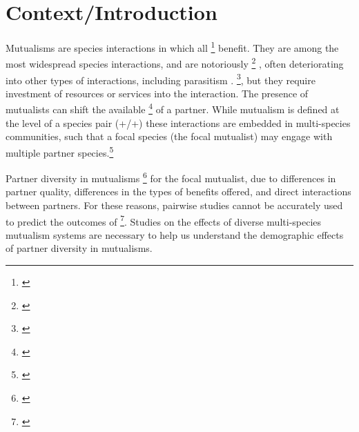 \documentclass[12pt,a4paper]{article}
\newcommand{\tom}[2]{{\color{red}{#1}}\footnote{\textit{\color{red}{#2}}}}
\begin{document}
\section*{Context/Introduction}

Mutualisms are species interactions in which all \tom{involved participants}{Notice the redundancy here. You don't need ``involved''.} benefit. They are among the most widespread species interactions\cite{Chamberlain2014, BoucherDouglasH.1985}, and are notoriously \tom{context dependent}{You need to define what you mean by this.} \cite{Bronstein1994,Chamberlain2014,Frederickson2013}, often deteriorating into other types of interactions, including parasitism \cite{Rodriguez-Rodriguez2017,Song2020,Mandyam2014,Thrall2007, Bahia2022}.
\tom{The benefits from these interactions are called rewards}{This is a pretty rudimentary definition, not necessary.}, but they require investment of resources or services into the interaction\cite{Bronstein2001}.
The presence of mutualists can shift the available \tom{habitat, fitness, or resource uptake}{These are very different things. I don't see why this sentence is needed in the context of your study.} of a partner\cite{Stachowicz2001,West2007}.
While mutualism is defined at the level of a species pair (+/+) these interactions are embedded in multi-species communities, such that a focal species (the focal mutualist) may engage with multiple partner species\cite{Stanton2013, Boucher1982}.\tom{}{I suggest you re-think whether most of this first paragraph is necessary.}

Partner diversity in mutualisms \tom{often leads to variable fitness benefits}{Not sure what you are saying here: different partners provide different fitness benefits? Or diversity per se has fitness benefits?} for the focal mutualist\cite{Afkhami2014, Palmer2010}, due to differences in partner quality\cite{Bascompte2019,Stanton2013,Frederickson2013,Jones2015, Ness2006}, differences in the types of benefits offered\cite{Kiers2003,Afkhami2014}, and direct interactions between partners\cite{Sun2019,Heath2009,Heath2014,Grutter2003}.
For these reasons, pairwise studies cannot be accurately used to predict the outcomes of \tom{multi-species mutualisms}{I think you need to operationally define this.}\cite{Palmer2010, Stanton2013, Chamberlain2014, Song2020}.
Studies on the effects of diverse multi-species mutualism systems are necessary to help us understand the demographic effects of partner diversity in mutualisms\cite{Bascompte2019}. 
\end{document}
